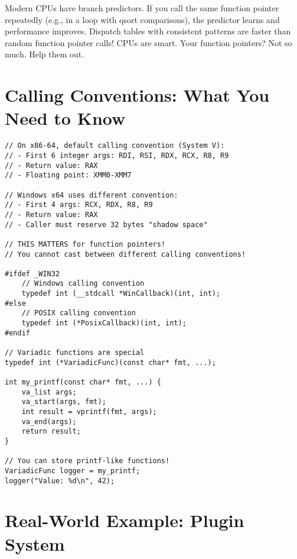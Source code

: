 \begin{tipbox}
Modern CPUs have branch predictors. If you call the same function pointer repeatedly (e.g., in a loop with qsort comparisons), the predictor learns and performance improves. Dispatch tables with consistent patterns are faster than random function pointer calls! CPUs are smart. Your function pointers? Not so much. Help them out.
\end{tipbox}

\section{Calling Conventions: What You Need to Know}

\begin{lstlisting}
// On x86-64, default calling convention (System V):
// - First 6 integer args: RDI, RSI, RDX, RCX, R8, R9
// - Return value: RAX
// - Floating point: XMM0-XMM7

// Windows x64 uses different convention:
// - First 4 args: RCX, RDX, R8, R9
// - Return value: RAX
// - Caller must reserve 32 bytes "shadow space"

// THIS MATTERS for function pointers!
// You cannot cast between different calling conventions!

#ifdef _WIN32
    // Windows calling convention
    typedef int (__stdcall *WinCallback)(int, int);
#else
    // POSIX calling convention
    typedef int (*PosixCallback)(int, int);
#endif

// Variadic functions are special
typedef int (*VariadicFunc)(const char* fmt, ...);

int my_printf(const char* fmt, ...) {
    va_list args;
    va_start(args, fmt);
    int result = vprintf(fmt, args);
    va_end(args);
    return result;
}

// You can store printf-like functions!
VariadicFunc logger = my_printf;
logger("Value: %d\n", 42);
\end{lstlisting}

\section{Real-World Example: Plugin System}

